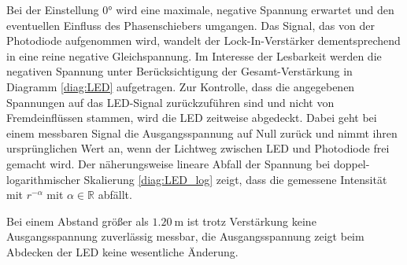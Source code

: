 Bei der Einstellung 0° wird eine maximale, negative Spannung erwartet und den eventuellen Einfluss des Phasenschiebers umgangen.
Das Signal, das von der Photodiode aufgenommen wird, wandelt der Lock-In-Verstärker dementsprechend in eine reine negative Gleichspannung.
Im Interesse der Lesbarkeit werden die negativen Spannung unter Berücksichtigung der Gesamt-Verstärkung in Diagramm \ref{diag:LED} aufgetragen.
Zur Kontrolle, dass die angegebenen Spannungen auf das LED-Signal zurückzuführen sind und nicht von Fremdeinflüssen stammen, wird die LED zeitweise abgedeckt.
Dabei geht bei einem messbaren Signal die Ausgangsspannung auf Null zurück und nimmt ihren ursprünglichen Wert an, wenn der Lichtweg zwischen LED und Photodiode frei gemacht wird.
Der näherungsweise lineare Abfall der Spannung bei doppel-logarithmischer Skalierung \eqref{diag:LED_log} zeigt, dass die gemessene Intensität mit $r^{-\alpha}$ mit $\alpha \in \mathbb{R}$ abfällt.

Bei einem Abstand größer als $\SI{1.20}{\meter}$ ist trotz Verstärkung keine Ausgangsspannung zuverlässig messbar, 
die Ausgangsspannung zeigt beim Abdecken der LED keine wesentliche Änderung.

